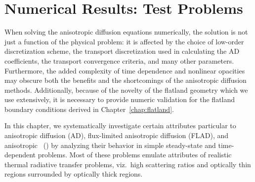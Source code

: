 
\chapter{Numerical Results: Test Problems}\label{chap:simpleNumericalResults}

When solving the anisotropic diffusion equations numerically, the solution
is not just a function of the physical problem: it is affected by the choice
of low-order discretization scheme, the transport discretization used in
calculating the AD coefficients, the transport convergence criteria, and many
other parameters. Furthermore, the added complexity of time dependence and
nonlinear opacities may obscure both the benefits and the shortcomings of the
anisotropic diffusion methods. Additionally, because of the novelty of the
flatland geometry which we use extensively, it is necessary to provide numeric
validation for the flatland boundary conditions derived in
Chapter~\ref{chap:flatland}.

In this chapter, we systematically investigate certain attributes particular to
anisotropic diffusion (AD), flux-limited anisotropic diffusion (FLAD), and
anisotropic \Pone\ (\APone) by analyzing their behavior in simple steady-state
and time-dependent problems. Most of these problems emulate attributes of
realistic thermal radiative transfer problems, viz.~high scattering ratios and
optically thin regions surrounded by optically thick regions.

